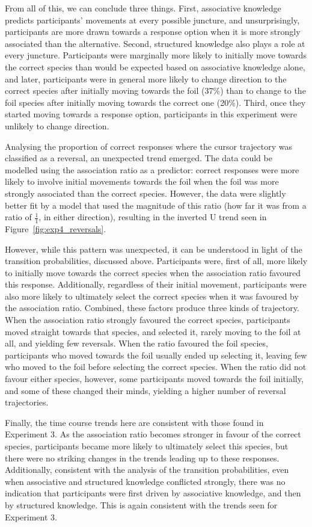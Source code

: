 From all of this, we can conclude three things.
First, associative knowledge predicts participants' movements
at every possible juncture, and unsurprisingly,
participants are more drawn towards a response option
when it is more strongly associated than the alternative.
Second, structured knowledge also plays a role at every juncture.
Participants were marginally more likely
to initially move towards the correct species
than would be expected based on associative knowledge alone,
and later, participants were in general more likely to change direction
to the correct species after initially moving towards the foil (37\%)
than to change to the foil species after
initially moving towards the correct one (20\%).
Third, once they started moving towards a response option,
participants in this experiment were unlikely to change direction.

Analysing the proportion of correct responses
where the cursor trajectory was classified as a reversal,
an unexpected trend emerged.
The data could be modelled using the association ratio as a predictor:
correct responses were more likely to involve
initial movements towards the foil
when the foil was more strongly associated than the correct species.
However, the data were slightly better fit by a model that
used the magnitude of this ratio
(how far it was from a ratio of $\frac{1}{1}$, in either direction),
resulting in the inverted U trend seen in Figure~\ref{fig:exp4_reversals}.

However, while this pattern was unexpected,
it can be understood in light of the transition probabilities, discussed above.
Participants were, first of all, more likely to
initially move towards the correct species
when the association ratio favoured this response.
Additionally, regardless of their initial movement,
participants were also more likely to ultimately select the correct species
when it was favoured by the association ratio.
Combined, these factors produce three kinds of trajectory.
When the association ratio strongly favoured the correct species,
participants moved straight towards that species, and selected it,
rarely moving to the foil at all,  and yielding few reversals.
When the ratio favoured the foil species,
participants who moved towards the foil usually ended up selecting it,
leaving few who moved to the foil before selecting the correct species.
When the ratio did not favour either species, however,
some participants  moved towards the foil initially,
and some of these changed their minds,
yielding a higher number of reversal trajectories.

Finally, the time course trends here are consistent with those found in Experiment 3.
As the association ratio becomes stronger in favour of the correct species,
participants became more likely to ultimately select this species,
but there were no striking changes in the trends leading up to these responses.
Additionally, consistent with the analysis of the transition probabilities,
even when associative and structured knowledge conflicted strongly,
there was no indication that participants were
first driven by associative knowledge,
and then by structured knowledge.
This is again consistent with the trends seen for Experiment 3.

